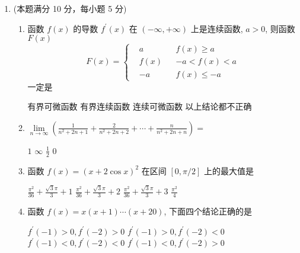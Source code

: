

\begin{enumerate}
	\item
	(本题满分 10 分，每小题 5 分)
	\begin{enumerate}
		\item
		函数 $f(x)$ 的导数 $f^{\prime}(x)$ 在 $(-\infty,+\infty)$ 上是连续函数, $a>0$, 则函数$ F(x) $
		\[
		F(x)=\left\{\begin{aligned}
			&a && f(x) \geqslant a \\
			&f(x) && -a<f(x)<a \\
			&-a && f(x) \leqslant-a
		\end{aligned}\right.
		\]
		一定是  
		
		
	\fourchoices
	{有界可微函数}
	{有界连续函数}
	{连续可微函数}
	{以上结论都不正确}

\item 	
$ 	\lim\limits _{n \rightarrow \infty}\left(\frac{1}{n^{2}+2 n+1}+\frac{2}{n^{2}+2 n+2}+\cdots+\frac{n}{n^{2}+2 n+n}\right)= $  

		
\fourchoices
{$ 1 $}
{$\infty$}
{$\frac{1}{2}$}
{$ 0 $}


\item 
函数 $f(x)=(x+2 \cos x)^{2}$ 在区间 $[0, \pi / 2]$ 上的最大值是  


\fourchoices
{$\frac{\pi^{2}}{36}+\frac{\sqrt{3} \pi}{3}+1$}
{$\frac{\pi^{2}}{36}+\frac{\sqrt{3} \pi}{3}+2$}
{$\frac{\pi^{2}}{36}+\frac{\sqrt{3} \pi}{3}+3$}
{$\frac{\pi^{2}}{4}$}





\item 
函数 $f(x)=x(x+1) \cdots(x+20)$, 下面四个结论正确的是  


\fourchoices
{$f^{\prime}(-1)>0, f^{\prime}(-2)>0$}
{$f^{\prime}(-1)>0, f^{\prime}(-2)<0$}
{$f^{\prime}(-1)<0, f^{\prime}(-2)<0$}
{$f^{\prime}(-1)<0, f^{\prime}(-2)>0$}


\end{enumerate}
\end{enumerate}
